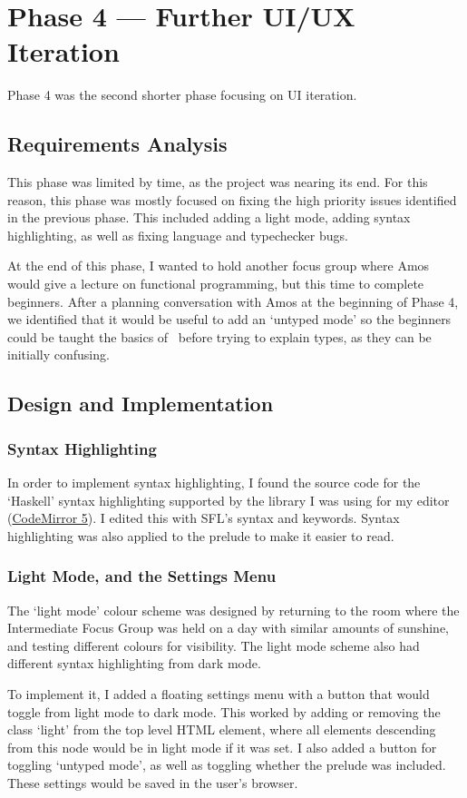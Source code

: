 \chapter{Phase 4 --- Further UI/UX Iteration}
Phase 4 was the second shorter phase focusing on UI iteration. 

\section{Requirements Analysis}
This phase was limited by time, as the project was nearing its end. For this reason, this phase was mostly focused on fixing the high priority issues identified in the previous phase. This included adding a light mode, adding syntax highlighting, as well as fixing language and typechecker bugs. 

At the end of this phase, I wanted to hold another focus group where Amos would give a lecture on functional programming, but this time to complete beginners. After a planning conversation with Amos at the beginning of Phase 4, we identified that it would be useful to add an `untyped mode' so the beginners could be taught the basics of \lcalc\ before trying to explain types, as they can be initially confusing. 

\section{Design and Implementation}
\subsection{Syntax Highlighting}
In order to implement syntax highlighting, I found the source code for the `Haskell' syntax highlighting supported by the library I was using for my editor (\href{https://codemirror.net/5/}{CodeMirror 5}). I edited this with SFL's syntax and keywords. Syntax highlighting was also applied to the prelude to make it easier to read. 

\subsection{Light Mode, and the Settings Menu}
The `light mode' colour scheme was designed by returning to the room where the Intermediate Focus Group was held on a day with similar amounts of sunshine, and testing different colours for visibility. The light mode scheme also had different syntax highlighting from dark mode. 

To implement it, I added a floating settings menu with a button that would toggle from light mode to dark mode. This worked by adding or removing the class `light' from the top level HTML element, where all elements descending from this node would be in light mode if it was set. I also added a button for toggling `untyped mode', as well as toggling whether the prelude was included. These settings would be saved in the user's browser.

